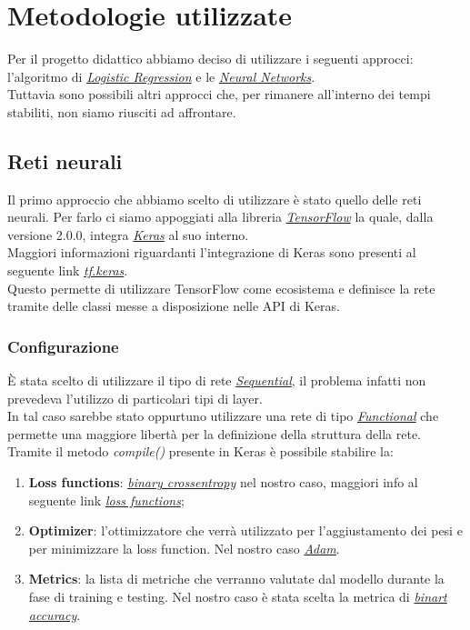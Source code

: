 \section{Metodologie utilizzate}
Per il progetto didattico abbiamo deciso di utilizzare i seguenti approcci: l'algoritmo di \href{https://en.wikipedia.org/wiki/Logistic_regression}{\textit{Logistic Regression}} e le \href{https://en.wikipedia.org/wiki/Neural_network}{\textit{Neural Networks}}.\\
Tuttavia sono possibili altri approcci che, per rimanere all'interno dei tempi stabiliti, non siamo riusciti ad affrontare. 

\subsection{Reti neurali}
Il primo approccio che abbiamo scelto di utilizzare è stato quello delle reti neurali.
Per farlo ci siamo appoggiati alla libreria \href{https://www.tensorflow.org/}{\textit{TensorFlow}} la quale, dalla versione 2.0.0, integra \href{https://keras.io/}{\textit{Keras}} al suo interno.\\
Maggiori informazioni riguardanti l'integrazione di Keras sono presenti al seguente link \href{https://www.tensorflow.org/guide/keras}{\textit{tf.keras}}.\\ 
Questo permette di utilizzare TensorFlow come ecosistema e definisce la rete tramite delle classi messe a disposizione nelle API di Keras.\\
\subsubsection{Configurazione}
È stata scelto di utilizzare il tipo di rete \href{https://keras.io/getting-started/sequential-model-guide/}{\textit{Sequential}}, il problema infatti non prevedeva l'utilizzo di particolari tipi di layer.\\ 
In tal caso sarebbe stato oppurtuno utilizzare una rete di tipo \href{https://keras.io/getting-started/functional-api-guide/}{\textit{Functional}} che permette una maggiore libertà per la definizione della struttura della rete.
Tramite il metodo \textit{compile()} presente in Keras è possibile stabilire la:
\begin{enumerate}
\item \textbf{Loss functions}: \href{https://en.wikipedia.org/wiki/Cross_entropy}{\textit{binary crossentropy}} nel nostro caso, maggiori info al seguente link \href{https://keras.io/losses/}{\textit{loss functions}};
\item \textbf{Optimizer}: l'ottimizzatore che verrà utilizzato per l'aggiustamento dei pesi e per minimizzare la loss function.
Nel nostro caso \href{https://arxiv.org/pdf/1412.6980v8.pdf}{\textit{Adam}}. 
\item \textbf{Metrics}: la lista di metriche che verranno valutate dal modello durante la fase di training e testing.
Nel nostro caso è stata scelta la metrica di \href{https://keras.io/metrics/#binary_accuracy}{\textit{binart accuracy}}.  
\end{enumerate} 


